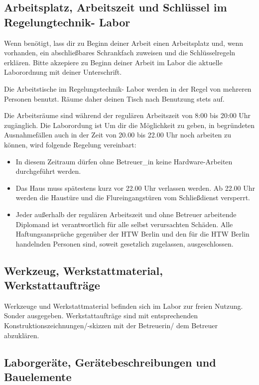 \subsection{Arbeitsplatz, Arbeitszeit und Schlüssel im Regelungtechnik- Labor}

Wenn benötigt, lass dir zu Beginn deiner Arbeit einen Arbeitsplatz und, wenn vorhanden, ein abschließbares Schrankfach zuweisen und die Schlüsselregeln  erklären. 
Bitte akzepiere zu Beginn deiner Arbeit im Labor die aktuelle Laborordnung mit deiner Unterschrift.

Die Arbeitstische im Regelungstechnik- Labor werden in der Regel von mehreren Personen benutzt. Räume daher deinen Tisch nach Benutzung stets auf.

Die Arbeitsräume sind während der regulären Arbeitszeit von 8:00 bis 20:00 Uhr zugänglich. Die Laborordung ist Um dir die Möglichkeit zu geben, in begründeten Ausnahmefällen auch in der Zeit von 20.00 bis 22.00 Uhr noch arbeiten zu können, wird folgende Regelung vereinbart:
\begin{itemize}
    \item In diesem Zeitraum dürfen ohne Betreuer\_in keine Hardware-Arbeiten durchgeführt werden.
    \item Das Haus muss spätestens kurz vor 22.00 Uhr verlassen werden. Ab 22.00 Uhr werden die Haustüre und die Flureingangstüren vom Schließdienst versperrt.
    \item Jeder außerhalb der regulären Arbeitszeit und ohne Betreuer arbeitende Diplomand ist verantwortlich für alle selbst verursachten Schäden. Alle Haftungsansprüche gegenüber der HTW Berlin und den für die HTW Berlin handelnden Personen sind, soweit gesetzlich zugelassen, ausgeschlossen.
\end{itemize}


\subsection{Werkzeug, Werkstattmaterial, Werkstattaufträge}

Werkzeuge und Werkstattmaterial befinden sich im Labor zur freien Nutzung. Sonder ausgegeben. Werkstattaufträge sind mit entsprechenden Konstruktionszeichnungen/-skizzen mit der Betreuerin/ dem Betreuer abzuklären.

\subsection{Laborgeräte, Gerätebeschreibungen und Bauelemente}

